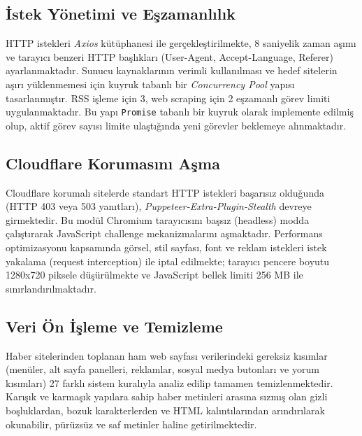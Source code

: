 \documentclass[conference]{IEEEtran}
\begin{document}
    \subsection{{\.I}stek Y{\"o}netimi ve E{\c s}zamanl{\i}l{\i}k}
    HTTP istekleri \textit{Axios} k{\"u}t{\"u}phanesi ile ger{\c c}ekle{\c s}tirilmekte, 8 saniyelik zaman a{\c s}{\i}m{\i} ve taray{\i}c{\i} benzeri HTTP ba{\c s}l{\i}klar{\i} (User-Agent, Accept-Language, Referer) ayarlanmaktad{\i}r. Sunucu kaynaklar{\i}n{\i}n verimli kullan{\i}lmas{\i} ve hedef sitelerin a{\c s}{\i}r{\i} y{\"u}klenmemesi i{\c c}in kuyruk tabanl{\i} bir \textit{Concurrency Pool} yap{\i}s{\i} tasarlanm{\i}{\c s}t{\i}r. RSS i{\c s}leme i{\c c}in 3, web scraping i{\c c}in 2 e{\c s}zamanl{\i} g{\"o}rev limiti uygulanmaktad{\i}r. Bu yap{\i} \texttt{Promise} tabanl{\i} bir kuyruk olarak implemente edilmi{\c s} olup, aktif g{\"o}rev say{\i}s{\i} limite ula{\c s}t{\i}{\u g}{\i}nda yeni g{\"o}revler beklemeye al{\i}nmaktad{\i}r.

    \subsection{Cloudflare Korumas{\i}n{\i} A{\c s}ma}
    Cloudflare korumal{\i} sitelerde standart HTTP istekleri ba{\c s}ar{\i}s{\i}z oldu{\u g}unda (HTTP 403 veya 503 yan{\i}tlar{\i}), \textit{Puppeteer-Extra-Plugin-Stealth} devreye girmektedir. Bu mod{\"u}l Chromium taray{\i}c{\i}s{\i}n{\i} ba{\c s}s{\i}z (headless) modda {\c c}al{\i}{\c s}t{\i}rarak JavaScript challenge mekanizmalar{\i}n{\i} a{\c s}maktad{\i}r. Performans optimizasyonu kapsam{\i}nda g{\"o}rsel, stil sayfas{\i}, font ve reklam istekleri istek yakalama (request interception) ile iptal edilmekte; taray{\i}c{\i} pencere boyutu 1280x720 piksele d{\"u}{\c s}{\"u}r{\"u}lmekte ve JavaScript bellek limiti 256 MB ile s{\i}n{\i}rland{\i}r{\i}lmaktad{\i}r.

    \subsection{Veri {\"O}n {\.I}{\c s}leme ve Temizleme}
    Haber sitelerinden toplanan ham web sayfası verilerindeki gereksiz kısımlar (menüler, alt sayfa panelleri, reklamlar, sosyal medya butonları ve yorum kısımları) 27 farklı sistem kuralıyla analiz edilip tamamen temizlenmektedir. Karışık ve karmaşık yapılara sahip haber metinleri arasına sızmış olan gizli boşluklardan, bozuk karakterlerden ve HTML kalıntılarından arındırılarak okunabilir, pürüzsüz ve saf metinler haline getirilmektedir.
\end{document}
